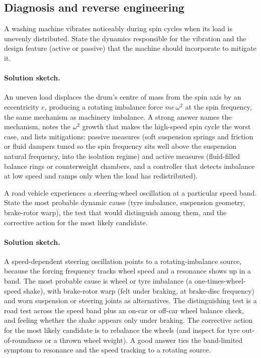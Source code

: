 \subsection*{Diagnosis and reverse engineering}

\begin{exercise}
A washing machine vibrates noticeably during spin cycles when its
load is unevenly distributed. State the dynamics responsible for the
vibration and the design feature (active or passive) that the
machine should incorporate to mitigate it.
\paragraph{Solution sketch.} An uneven load displaces the drum's
centre of mass from the spin axis by an eccentricity $e$, producing a
rotating imbalance force $m e\,\omega^{2}$ at the spin frequency, the
same mechanism as machinery imbalance. A strong answer names the
mechanism, notes the $\omega^{2}$ growth that makes the high-speed
spin cycle the worst case, and lists mitigations: passive measures
(soft suspension springs and friction or fluid dampers tuned so the
spin frequency sits well above the suspension natural frequency, into
the isolation regime) and active measures (fluid-filled balance rings
or counterweight chambers, and a controller that detects imbalance at
low speed and ramps only when the load has redistributed).
\end{exercise}

\begin{exercise}
A road vehicle experiences a steering-wheel oscillation at a
particular speed band. State the most probable dynamic cause (tyre
imbalance, suspension geometry, brake-rotor warp), the test that
would distinguish among them, and the corrective action for the
most likely candidate.
\paragraph{Solution sketch.} A speed-dependent steering oscillation
points to a rotating-imbalance source, because the forcing frequency
tracks wheel speed and a resonance shows up in a band. The most
probable cause is wheel or tyre imbalance (a one-times-wheel-speed
shake), with brake-rotor warp (felt under braking, at brake-disc
frequency) and worn suspension or steering joints as alternatives. The
distinguishing test is a road test across the speed band plus an
on-car or off-car wheel balance check, and feeling whether the shake
appears only under braking. The corrective action for the most likely
candidate is to rebalance the wheels (and inspect for tyre
out-of-roundness or a thrown wheel weight). A good answer ties the
band-limited symptom to resonance and the speed tracking to a rotating
source.
\end{exercise}

